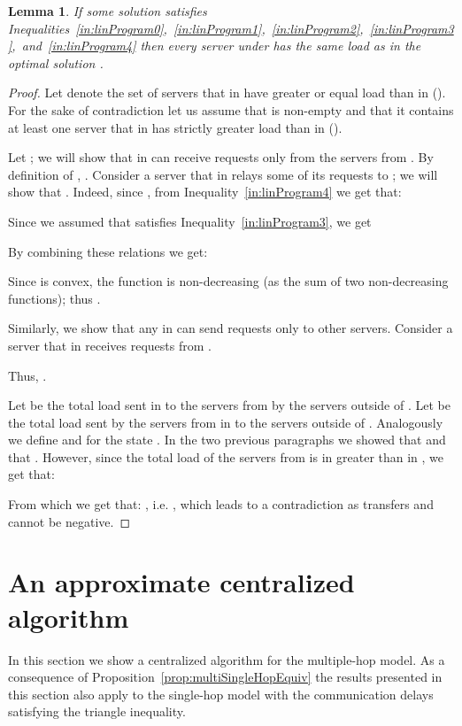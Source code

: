 \documentclass[11pt]{article}
\newtheorem{lemma}[theorem]{Lemma}
\begin{document}
\begin{lemma}\label{lemma:linProg}
If some solution  satisfies Inequalities~\ref{in:linProgram0},~\ref{in:linProgram1},~\ref{in:linProgram2},~\ref{in:linProgram3},~and~\ref{in:linProgram4} then every server  under  has the same load as in the optimal solution .
\end{lemma}
\begin{proof}
Let  denote the set of servers that in  have greater or equal load than in  (). For the sake of contradiction let us assume that  is non-empty and that it contains at least one server  that in  has strictly greater load than in  ().

Let ; we will show that  in  can receive requests only from the servers from .
By definition of , . Consider a server  that in  relays some of its requests to ; we will show that . Indeed, since , from Inequality~\ref{in:linProgram4} we get that:

Since we assumed that  satisfies Inequality~\ref{in:linProgram3}, we get

By combining these relations we get:

Since  is convex, the function  is non-decreasing (as the sum of two non-decreasing functions); thus .

Similarly, we show that any  in  can send requests only to other  servers. 
Consider a server  that in  receives requests from . 

Thus, .

Let  be the total load sent in  to the servers from  by the servers outside of . Let  be the total load sent by the servers from  in  to the servers outside of . Analogously we define  and  for the state . In the two previous paragraphs we showed that  and that . However, since the total load of the servers from  is in  greater than in , we get that:

From which we get that: , i.e. , which leads to a contradiction as transfers  and  cannot be negative.
\end{proof}


\section{An approximate centralized algorithm}\label{sec:approximate-centralized}

In this section we show a centralized algorithm for the multiple-hop model. As a consequence of Proposition~\ref{prop:multiSingleHopEquiv} the results presented in this section also apply to the single-hop model with the communication delays satisfying the triangle inequality.
\end{document}
